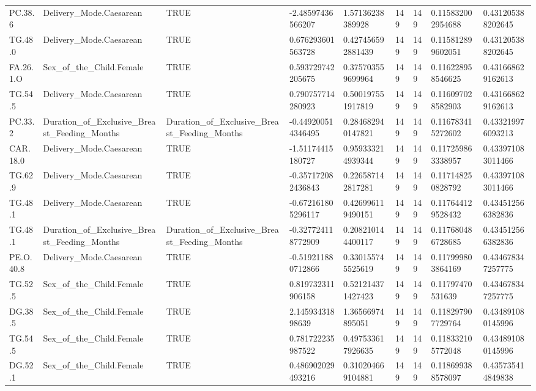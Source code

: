 \begin{longtable}{lllllllll}
PC.38.6 & Delivery\_Mode.Caesarean & TRUE & -2.48597436566207 & 1.57136238389928 & 149 & 149 & 0.115832002954688 & 0.431205388202645 \\
TG.48.0 & Delivery\_Mode.Caesarean & TRUE & 0.676293601563728 & 0.427456592881439 & 149 & 149 & 0.115812899602051 & 0.431205388202645 \\
FA.26.1.O & Sex\_of\_the\_Child.Female & TRUE & 0.593729742205675 & 0.375703559699964 & 149 & 149 & 0.116228958546625 & 0.431668629162613 \\
TG.54.5 & Delivery\_Mode.Caesarean & TRUE & 0.790757714280923 & 0.500197551917819 & 149 & 149 & 0.116097028582903 & 0.431668629162613 \\
PC.33.2 & Duration\_of\_Exclusive\_Breast\_Feeding\_Months & Duration\_of\_Exclusive\_Breast\_Feeding\_Months & -0.449200514346495 & 0.284682940147821 & 149 & 149 & 0.116783415272602 & 0.433219976093213 \\
CAR.18.0 & Delivery\_Mode.Caesarean & TRUE & -1.51174415180727 & 0.959333214939344 & 149 & 149 & 0.117259863338957 & 0.433971083011466 \\
TG.62.9 & Delivery\_Mode.Caesarean & TRUE & -0.357172082436843 & 0.226587142817281 & 149 & 149 & 0.117148250828792 & 0.433971083011466 \\
TG.48.1 & Delivery\_Mode.Caesarean & TRUE & -0.672161805296117 & 0.426996119490151 & 149 & 149 & 0.117644129528432 & 0.434512566382836 \\
TG.48.1 & Duration\_of\_Exclusive\_Breast\_Feeding\_Months & Duration\_of\_Exclusive\_Breast\_Feeding\_Months & -0.327724118772909 & 0.208210144400117 & 149 & 149 & 0.117680486728685 & 0.434512566382836 \\
PE.O.40.8 & Delivery\_Mode.Caesarean & TRUE & -0.519211880712866 & 0.330155745525619 & 149 & 149 & 0.117999803864169 & 0.434678347257775 \\
TG.52.5 & Sex\_of\_the\_Child.Female & TRUE & 0.819732311906158 & 0.521214371427423 & 149 & 149 & 0.11797470531639 & 0.434678347257775 \\
DG.38.5 & Sex\_of\_the\_Child.Female & TRUE & 2.14593431898639 & 1.36566974895051 & 149 & 149 & 0.118297907729764 & 0.434891080145996 \\
TG.54.5 & Sex\_of\_the\_Child.Female & TRUE & 0.781722235987522 & 0.497533617926635 & 149 & 149 & 0.118332105772048 & 0.434891080145996 \\
DG.52.1 & Sex\_of\_the\_Child.Female & TRUE & 0.486902029493216 & 0.310204669104881 & 149 & 149 & 0.118699388578097 & 0.435735414849838 \\

\end{longtable}
